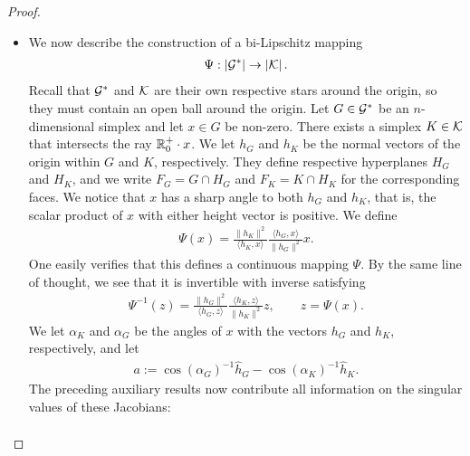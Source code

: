 \documentclass[10pt,a4paper]{article}
\newcommand{\mwl}[1]{{\color{red}#1}}
\begin{document}
\begin{proof}
\begin{itemize}
        \item 
        We now describe the construction of a bi-Lipschitz mapping 
        \begin{align*}
            \Psi : \left| {\mathcal G}^\ast \right| \rightarrow \left| {\mathcal K} \right|.
        \end{align*}
        Recall that ${\mathcal G}^\ast$ and ${\mathcal K}$ are their own respective stars around the origin,
        so they must contain an open ball around the origin. 
        Let ${G} \in {\mathcal G}^\ast$ be an $n$-dimensional simplex and let $x \in {G}$ be non-zero. There exists a simplex $K \in {\mathcal K}$ that intersects the ray ${\mathbb R}_0^+ \cdot x$. We let $h_{{G}}$ and $h_{K}$ be the normal vectors of the origin within ${G}$ and $K$, respectively. They define respective hyperplanes $H_{G}$ and $H_{K}$,
        and we write $F_{G} = G \cap H_{G}$ and $F_{K} = K \cap H_{K}$ for the corresponding faces. 
        We notice that $x$ has a sharp angle to both $h_{{G}}$ and $h_{K}$,
        that is, the scalar product of $x$ with either height vector is positive. 
        We define 
        \begin{align*}
            \Psi(x) 
            = 
            \frac{ \| h_K \|^{2} }{ \langle h_K, x \rangle }
            \frac{ \langle h_{{G}}, x \rangle }{ \| h_{{G}} \|^{2} }
            x
            .
        \end{align*}
        One easily verifies that this defines a continuous mapping $\Psi$. 
        By the same line of thought, we see that it is invertible with inverse satisfying 
        \begin{align*}
            \Psi^{-1}(z) 
            = 
            \frac{ \| h_{{G}} \|^{2} }{ \langle h_{{G}}, z \rangle }
            \frac{ \langle h_K, z \rangle }{ \| h_K \|^{2} }
            z,
            \qquad 
            z = \Psi(x)
            .
        \end{align*}
        We let $\alpha_K$ and $\alpha_{{G}}$ be the angles of $x$ with the vectors $h_{{G}}$ and $h_{K}$, respectively,
        and let 
        \begin{align*}
            a := \cos(\alpha_{{G}})^{-1} \hat h_{{G}} - \cos(\alpha_K)^{-1} \hat h_K
            .
        \end{align*}
        The preceding auxiliary results now contribute all information on the singular values of these Jacobians:
        \begin{gather*}

\end{gather*}
\end{itemize}
\end{proof}
\end{document}
